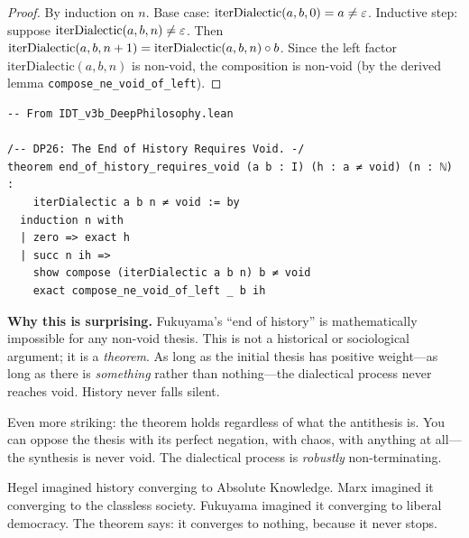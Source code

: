 \begin{proof}
By induction on $n$.  Base case: $\mathrm{iterDialectic}(a,b,0) = a \neq \varepsilon$.
Inductive step: suppose $\mathrm{iterDialectic}(a,b,n) \neq \varepsilon$.  Then
$\mathrm{iterDialectic}(a,b,n+1) = \mathrm{iterDialectic}(a,b,n) \circ b$.
Since the left factor $\mathrm{iterDialectic}(a,b,n)$ is non-void,
the composition is non-void (by the derived lemma
\texttt{compose\_ne\_void\_of\_left}).
\end{proof}

\begin{lstlisting}
-- From IDT_v3b_DeepPhilosophy.lean

/-- DP26: The End of History Requires Void. -/
theorem end_of_history_requires_void (a b : I) (h : a ≠ void) (n : ℕ) :
    iterDialectic a b n ≠ void := by
  induction n with
  | zero => exact h
  | succ n ih =>
    show compose (iterDialectic a b n) b ≠ void
    exact compose_ne_void_of_left _ b ih
\end{lstlisting}

\begin{surprisebox}
\noindent\textbf{Why this is surprising.}
Fukuyama's ``end of history'' is mathematically impossible for any
non-void thesis.  This is not a historical or sociological argument;
it is a \emph{theorem}.  As long as the initial thesis has positive
weight---as long as there is \emph{something} rather than nothing---the
dialectical process never reaches void.  History never falls silent.

Even more striking: the theorem holds regardless of what the antithesis
is.  You can oppose the thesis with its perfect negation, with chaos,
with anything at all---the synthesis is never void.  The dialectical
process is \emph{robustly} non-terminating.

Hegel imagined history converging to Absolute Knowledge.  Marx imagined
it converging to the classless society.  Fukuyama imagined it
converging to liberal democracy.  The theorem says: it converges to
nothing, because it never stops.
\end{surprisebox}

